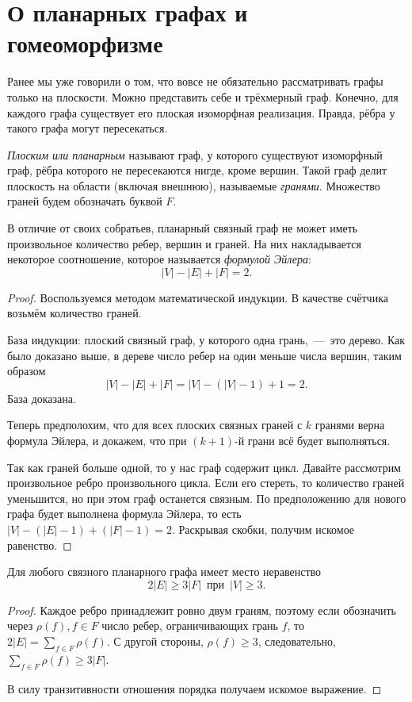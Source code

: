 \newpage
\section{О планарных графах и гомеоморфизме}

	Ранее мы уже говорили о том, что вовсе не обязательно рассматривать графы только на плоскости. 
	Можно представить себе и трёхмерный граф. Конечно, для каждого графа существует его плоская изоморфная реализация. 
	Правда, рёбра у такого графа могут пересекаться.

\begin{definition}
	\emph{Плоским или планарным} называют граф, у которого существуют изоморфный граф, рёбра которого не пересекаются нигде, 
	кроме вершин. Такой граф делит плоскость на области (включая внешнюю), называемые \emph{гранями}. Множество граней будем 
	обозначать буквой $F$.
\end{definition}


	В отличие от своих собратьев, планарный связный граф не может иметь произвольное количество ребер, вершин и граней. 
	На них накладывается некоторое соотношение, которое называется \emph{формулой Эйлера}: $$|V| - |E| + |F| = 2.$$

\begin{proof}
	Воспользуемся методом математической индукции. В качестве счётчика возьмём количество граней.

	База индукции: плоский связный граф, у которого одна грань,~---~это дерево. Как было доказано выше, 
	в дереве число ребер на один меньше числа вершин, таким образом 
	$$|V| - |E| + |F| = |V| - (|V| - 1) + 1 = 2.$$
	База доказана.
	
	Теперь предполохим, что для всех плоских связных граней с $k$ гранями верна формула Эйлера, и докажем, 
	что при $(k+1)$-й грани всё будет выполняться.
	
	Так как граней больше одной, то у нас граф содержит цикл. Давайте рассмотрим произвольное ребро произвольного цикла. 
	Если его стереть, то количество граней уменьшится, но при этом граф останется связным. 
	По предположению для нового графа будет выполнена формула Эйлера, то есть $|V| - (|E| - 1) + (|F| - 1) = 2$. 
	Раскрывая скобки, получим искомое равенство.
\end{proof}

\begin{statement}
	Для любого связного планарного графа имеет место неравенство
	$$2|E| \geqslant 3|F| \;\ \text{при} \;\ |V| \geqslant 3.$$
\begin{proof}
	Каждое ребро принадлежит ровно двум граням, поэтому если обозначить через $\rho(f), f \in F$ число ребер,
	ограничивающих грань $f$, то $2|E| = \displaystyle\sum_{f \in F} \rho(f)$. С другой стороны, $\rho(f) \geqslant 3$, 
	следовательно, $\displaystyle\sum_{f \in F} \rho(f) \geqslant 3|F|$.
	
	В силу транзитивности отношения порядка получаем искомое выражение.
\end{proof}
\end{statement}

